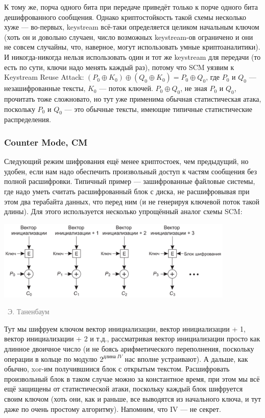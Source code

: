 \documentclass[a5paper]{article}
\newcommand{\attribution}[1] {
\vspace{-5mm}\begin{flushright}\begin{scriptsize}\textcolor{gray}{\textcopyright\, #1}\end{scriptsize}\end{flushright}
}
\begin{document}
К тому же, порча одного бита при передаче приведёт только к порче одного бита дешифрованного сообщения. Однако криптостойкость такой схемы несколько хуже --- во-первых, keystream всё-таки определяется целиком начальным ключом (хоть он и довольно случаен, число возможных keystream-ов ограничено и они не совсем случайны, что, наверное, могут использовать умные криптоаналитики). И никогда-никогда нельзя использовать один и тот же keystream для передачи (то есть по сути, ключи надо менять каждый раз), потому что SCM уязвим к Keystream Reuse Attack: $(P_0 \oplus K_0) \oplus (Q_0 \oplus K_0) = P_0 \oplus Q_0$, где $P_0$ и $Q_0$ --- незашифрованные тексты, $K_0$ --- поток ключей.  $P_0 \oplus Q_0$, не зная $P_0$ и $Q_0$, прочитать тоже сложновато, но тут уже применима обычная статистическая атака, поскольку $P_0$ и $Q_0$ --- это обычные тексты, имеющие типичные статистические распределения.

\subsubsection{Counter Mode, CM}

Следующий режим шифрования ещё менее криптостоек, чем предыдущий, но удобен, если нам надо обеспечить произвольный доступ к частям сообщения без полной расшифровки. Типичный пример --- зашифрованные файловые системы, где надо уметь считать расшифрованный блок с диска, не расшифровывая при этом два терабайта данных, что перед ним (и не генерируя ключевой поток такой длины). Для этого используется несколько упрощённый аналог схемы SCM:

\begin{center}
    \includegraphics[width=0.85\textwidth]{cm.png}
    \attribution{Э. Таненбаум}
\end{center}

Тут мы шифруем ключом вектор инициализации, вектор инициализации + 1, вектор инициализации + 2 и т.д., рассматривая вектор инициализации просто как длинное двоичное число (и не боясь арифметического переполнения, поскольку операции в кольце по модулю $2^{длина\ IV}$ нас вполне устраивают). А дальше, как обычно, xor-им получившиися блок с открытым текстом. Расшифровать произвольный блок в таком случае можно за константное время, при этом мы всё ещё защищены от статистической атаки, поскольку каждый блок шифруется своим ключом (хоть они, как и раньше, все выводятся из начального ключа, и тут даже по очень простому алгоритму). Напомним, что IV --- не секрет.
\end{document}
